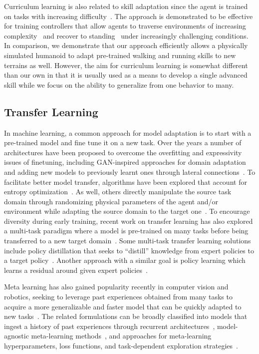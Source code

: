 Curriculum learning is also related to skill adaptation since the agent is trained on tasks with increasing difficulty~\cite{karpathy2012curriculum,symmetric}. 
The approach is demonstrated to be effective for training controllers that allow agents to traverse environments of increasing complexity~\cite{ALLSTEPS2020,heess2017emergence} and recover to standing~\cite{Frezzato2022} under increasingly challenging conditions. In comparison, we demonstrate that our approach efficiently allows a physically simulated humanoid to adapt pre-trained walking and running skills to new terrains as well. However, the aim for curriculum learning is somewhat different than our own in that it is usually used as a means to develop a single advanced skill while we focus on the ability to generalize from one behavior to many.  %




\subsection{Transfer Learning}
In machine learning, a common approach for model adaptation is to start with a pre-trained model and fine tune it on a new task. 
Over the years a number of architectures %
have been proposed to overcome %
the overfitting and expressivity issues of finetuning, 
including GAN-inspired approaches for domain adaptation~\cite{ganin2016domain,tzeng17} and 
adding new models to previously learnt ones through lateral connections~\cite{rusu2016progressive,rusu2017sim}.
To %
facilitate better model transfer, algorithms have been explored that account for entropy optimization~\cite{haarnoja2017reinforcement,wang2020tent}. As well, others directly manipulate the source task domain through randomizing physical parameters of the agent and/or environment while adapting the source domain to the target one~\cite{rajeswaran2017epopt,peng2018sim,ganin2016domain}. 
To encourage diversity during early training, recent work on transfer learning has also explored a multi-task paradigm where a model is pre-trained on many tasks before being transferred to a new target domain~\cite{devin2017learning,alet2018modular}.
Some multi-task transfer learning solutions include  
policy distillation that 
seeks to ``distill'' knowledge from expert policies to a target policy~\cite{rusu2015policy,ParisottoBS15}.   
Another approach with a similar goal is policy learning which learns a residual around given expert policies~\cite{silver2018residual}. 

Meta learning has also gained popularity recently in computer vision and robotics, seeking to leverage past experiences obtained from many tasks to acquire a more generalizable and faster model that can be quickly adapted to new tasks~\cite{andrychowicz2016learning,ravi2017optimization}. 
The related formulations can be broadly classified into models that ingest a history of past experiences through recurrent architectures~\cite{duan2016rl,heess2015memory}, model-agnostic meta-learning methods~\cite{finn2017model,nichol2018first}, and approaches for meta-learning hyperparameters, loss functions, and task-dependent exploration strategies~\cite{xu2018meta,houthooft2018evolved,gupta2018meta}. 

